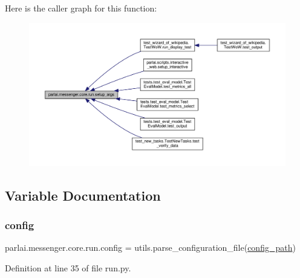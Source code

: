 Here is the caller graph for this function\+:
\nopagebreak
\begin{figure}[H]
\begin{center}
\leavevmode
\includegraphics[width=350pt]{namespaceparlai_1_1messenger_1_1core_1_1run_a32e58ff98e486caecc5f8941e70db244_icgraph}
\end{center}
\end{figure}


\subsection{Variable Documentation}
\mbox{\label{namespaceparlai_1_1messenger_1_1core_1_1run_afd96c3dc0b92a7b4965c9d97ac6453a2}} 
\subsubsection{\texorpdfstring{config}{config}}
{\footnotesize\ttfamily parlai.\+messenger.\+core.\+run.\+config = utils.\+parse\+\_\+configuration\+\_\+file(\hyperlink{namespaceparlai_1_1messenger_1_1core_1_1run_a98d6a2a74014b613043f52299a3b057c}{config\+\_\+path})}



Definition at line 35 of file run.\+py.

\mbox{\label{namespaceparlai_1_1messenger_1_1core_1_1run_a98d6a2a74014b613043f52299a3b057c}} 
